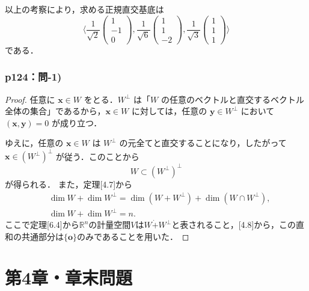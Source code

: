 \documentclass[a4paper,10pt,fleqn]{ltjsarticle}
\begin{document}
\begin{tleftbar}
    以上の考察により，求める正規直交基底は
    \[
        \langle \frac{1}{\sqrt{2}} \begin{pmatrix} 1 \\ -1 \\ 0 \end{pmatrix} , \frac{1}{\sqrt{6}} \begin{pmatrix} 1 \\ 1\\ -2 \end{pmatrix} ,  \frac{1}{\sqrt{3}} \begin{pmatrix} 1 \\ 1 \\ 1 \end{pmatrix} \rangle
    \]
    である．
\end{tleftbar}
\newpage


\section*{p124：問-1)}

\begin{tleftbar}
    \begin{proof}
        任意に $\bm{x} \in W$ をとる．$W^{\perp}$ は「$W$ の任意のベクトルと直交するベクトル全体の集合」であるから，$\bm{x} \in W$ に対しては，任意の $\bm{y} \in W^{\perp}$ において $(\bm{x}, \bm{y})=0$ が成り立つ．

        ゆえに，任意の $\bm{x} \in W$ は $W^{\perp}$ の元全てと直交することになり，したがって $\bm{x} \in (W^{\perp})^{\perp}$ が従う．このことから
        \[
            W \subset (W^{\perp})^{\perp}
        \]
        が得られる．
        また，定理[4.7]から
        \begin{align*}
             & \dim W +\dim W^{\perp} =\dim (W +W^{\perp} )+\dim (W \cap W^{\perp} ), \\
             & \dim W +\dim W^{\perp} =n.
        \end{align*}
        ここで定理[6.4]から$\mathbb{R}^n$の計量空間$V$は$W\dot{+}W^{\perp}$と表されること，[4.8]から，この直和の共通部分は$\{ \bm{o} \}$のみであることを用いた．
    \end{proof}
\end{tleftbar}


\newpage
\part*{第4章・章末問題}
\end{document}
